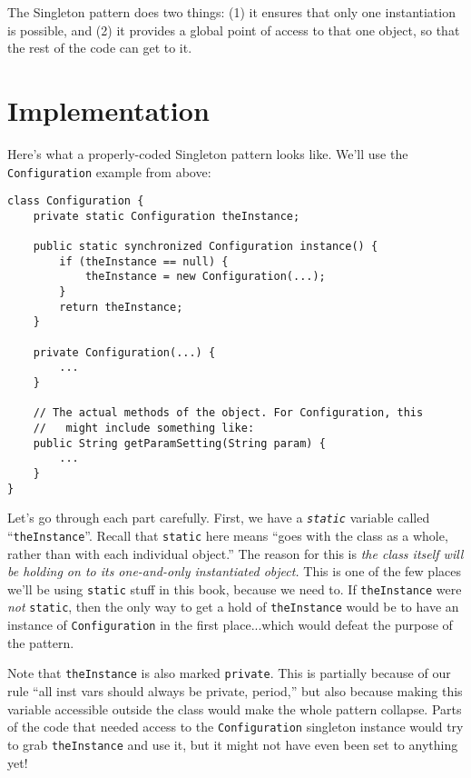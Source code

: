 The Singleton pattern does two things: (1) it ensures that only one
instantiation is possible, and (2) it provides a global point of access to
that one object, so that the rest of the code can get to it.

\section{Implementation}

Here's what a properly-coded Singleton pattern looks like. We'll use the
\texttt{Configuration} example from above:

\begin{Verbatim}[fontsize=\small,samepage=true,frame=single]
class Configuration {
    private static Configuration theInstance;
    
    public static synchronized Configuration instance() {
        if (theInstance == null) {
            theInstance = new Configuration(...);
        }
        return theInstance;
    }

    private Configuration(...) {
        ...
    }

    // The actual methods of the object. For Configuration, this
    //   might include something like:
    public String getParamSetting(String param) {
        ...
    }
}
\end{Verbatim}

Let's go through each part carefully. First, we have a
\textit{\texttt{static}} variable called ``\texttt{theInstance}''. Recall that
\texttt{static} here means ``goes with the class as a whole, rather than with
each individual object.'' The reason for this is \textit{the class itself will
be holding on to its one-and-only instantiated object.} This is one of the few
places we'll be using \texttt{static} stuff in this book, because we need to.
If \texttt{theInstance} were \textit{not} \texttt{static}, then the only way
to get a hold of \texttt{theInstance} would be to have an instance of
\texttt{Configuration} in the first place...which would defeat the purpose of
the pattern.

Note that \texttt{theInstance} is also marked \texttt{private}. This is
partially because of our rule ``all inst vars should always be private,
period,'' but also because making this variable accessible outside the class
would make the whole pattern collapse. Parts of the code that needed access to
the \texttt{Configuration} singleton instance would try to grab
\texttt{theInstance} and use it, but it might not have even been set to
anything yet!

